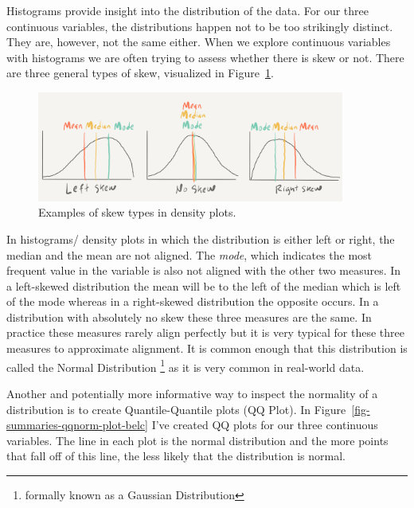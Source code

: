 \documentclass[
  letterpaper,
]{latex/krantz}
\begin{document}
Histograms provide insight into the distribution of the data. For our
three continuous variables, the distributions happen not to be too
strikingly distinct. They are, however, not the same either. When we
explore continuous variables with histograms we are often trying to
assess whether there is skew or not. There are three general types of
skew, visualized in Figure~\ref{fig-summaries-skew-graphic}.

\begin{figure}[h]

{\centering \includegraphics[width=0.9\textwidth,height=\textheight]{./figures/approaching-analysis/skew-types-paper.png}

}

\caption{\label{fig-summaries-skew-graphic}Examples of skew types in
density plots.}

\end{figure}

In histograms/ density plots in which the distribution is either left or
right, the median and the mean are not aligned. The \emph{mode}, which
indicates the most frequent value in the variable is also not aligned
with the other two measures. In a left-skewed distribution the mean will
be to the left of the median which is left of the mode whereas in a
right-skewed distribution the opposite occurs. In a distribution with
absolutely no skew these three measures are the same. In practice these
measures rarely align perfectly but it is very typical for these three
measures to approximate alignment. It is common enough that this
distribution is called the Normal Distribution \footnote{formally known
  as a Gaussian Distribution} as it is very common in real-world data.

Another and potentially more informative way to inspect the normality of
a distribution is to create Quantile-Quantile plots (QQ Plot). In
Figure~\ref{fig-summaries-qqnorm-plot-belc} I've created QQ plots for
our three continuous variables. The line in each plot is the normal
distribution and the more points that fall off of this line, the less
likely that the distribution is normal.
\end{document}
